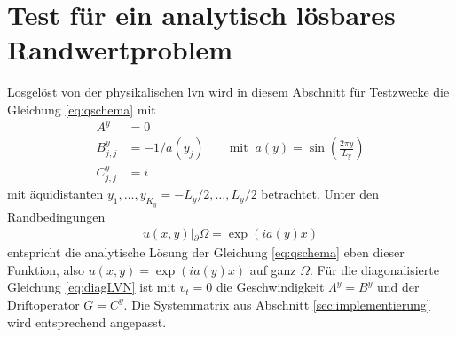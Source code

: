 \section{Test für ein analytisch lösbares Randwertproblem}\label{sec:test}
Losgelöst von der physikalischen \ac{lvn} wird in diesem Abschnitt für Testzwecke die Gleichung \eqref{eq:qschema} mit
\begin{equation*}
  \begin{aligned}
    A^y& = 0 \\
    B^y_{j,j} &= -1/a(y_j) \qquad \text{mit} \;\; a(y)=\sin\left(\frac{2\pi y}{L_y}\right) \\
    C^y_{j,j} &= i
  \end{aligned}
\end{equation*}
mit äquidistanten $y_1,\dots,y_{K_y}=-L_y/2,\dots,L_y/2$ betrachtet. Unter den Randbedingungen
\begin{equation*}
  \begin{aligned}
    u(x,y)|{_\partial \Omega} = \exp(ia(y)x)
  \end{aligned}
\end{equation*}
entspricht die analytische Lösung der Gleichung \eqref{eq:qschema} eben dieser Funktion, also $u(x,y) = \exp(ia(y)x)$ auf ganz $\Omega$. Für die diagonalisierte Gleichung \eqref{eq:diagLVN} ist mit $v_t=0$ die Geschwindigkeit $\Lambda^y=B^y$ und der Driftoperator $G=C^y$. Die Systemmatrix aus Abschnitt \ref{sec:implementierung} wird entsprechend angepasst.

